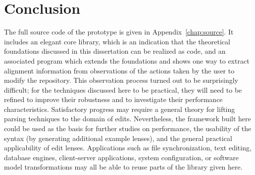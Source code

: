 \section{Conclusion}
\label{sec:impl-conclusion}
The full source code of the prototype is given in
Appendix~\ref{chap:source}. It includes an
elegant core library, which is an indication that the theoretical
foundations discussed in this dissertation can be realized as code, and an
associated program which extends the foundations and shows one way to
extract alignment information from observations of the actions taken by the
user to modify the repository. This observation process turned out to be
surprisingly difficult; for the techniques discussed here to be practical,
they will need to be refined to improve their robustness and to investigate
their performance characteristics. Satisfactory progress may require a
general theory for lifting parsing techniques to the domain of edits.
Nevertheless, the framework built here could be used as the basis for
further studies on performance, the usability of the syntax (by generating
additional example lenses), and the general practical applicability of
edit lenses. Applications such as file synchronization, text editing,
database engines, client-server applications, system configuration, or
software model transformations may all be able to reuse parts of the library
given here.
